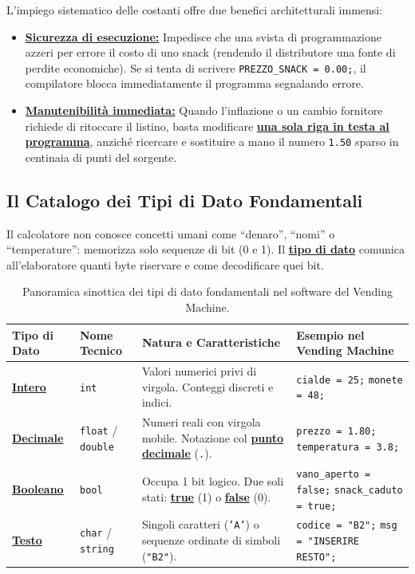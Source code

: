 L'impiego sistematico delle costanti offre due benefici architetturali immensi:
\begin{itemize}
  \item \textbf{\underline{Sicurezza di esecuzione:}} Impedisce che una svista di programmazione azzeri per errore il costo di uno snack (rendendo il distributore una fonte di perdite economiche). Se si tenta di scrivere \texttt{PREZZO\_SNACK = 0.00;}, il compilatore blocca immediatamente il programma segnalando errore.
  \item \textbf{\underline{Manutenibilità immediata:}} Quando l'inflazione o un cambio fornitore richiede di ritoccare il listino, basta modificare \textbf{\underline{una sola riga in testa al programma}}, anziché ricercare e sostituire a mano il numero \texttt{1.50} sparso in centinaia di punti del sorgente.
\end{itemize}

\subsection{Il Catalogo dei Tipi di Dato Fondamentali}

Il calcolatore non conosce concetti umani come ``denaro'', ``nomi'' o ``temperature'': memorizza solo sequenze di bit (0 e 1). Il \textbf{\underline{tipo di dato}} comunica all'elaboratore quanti byte riservare e come decodificare quei bit.

\begin{table}[htbp]
\centering
\small
\begin{tabular}{|l|l|p{4.8cm}|p{4.5cm}|}
\hline
\rowcolor{PiazzaPrimary!15}
\textbf{Tipo di Dato} & \textbf{Nome Tecnico} & \textbf{Natura e Caratteristiche} & \textbf{Esempio nel Vending Machine} \\
\hline
\textbf{\underline{Intero}} & \texttt{int} & Valori numerici privi di virgola. Conteggi discreti e indici. & \texttt{cialde = 25;} \newline \texttt{monete = 48;} \\
\hline
\textbf{\underline{Decimale}} & \texttt{float} / \texttt{double} & Numeri reali con virgola mobile. Notazione col \textbf{\underline{punto decimale}} (\texttt{.}). & \texttt{prezzo = 1.80;} \newline \texttt{temperatura = 3.8;} \\
\hline
\textbf{\underline{Booleano}} & \texttt{bool} & Occupa 1 bit logico. Due soli stati: \textbf{\underline{true}} (1) o \textbf{\underline{false}} (0). & \texttt{vano\_aperto = false;} \newline \texttt{snack\_caduto = true;} \\
\hline
\textbf{\underline{Testo}} & \texttt{char} / \texttt{string} & Singoli caratteri (\texttt{'A'}) o sequenze ordinate di simboli (\texttt{"B2"}). & \texttt{codice = "B2";} \newline \texttt{msg = "INSERIRE RESTO";} \\
\hline
\end{tabular}
\caption{Panoramica sinottica dei tipi di dato fondamentali nel software del Vending Machine.}
\label{tab:tipi-dati}
\end{table}


